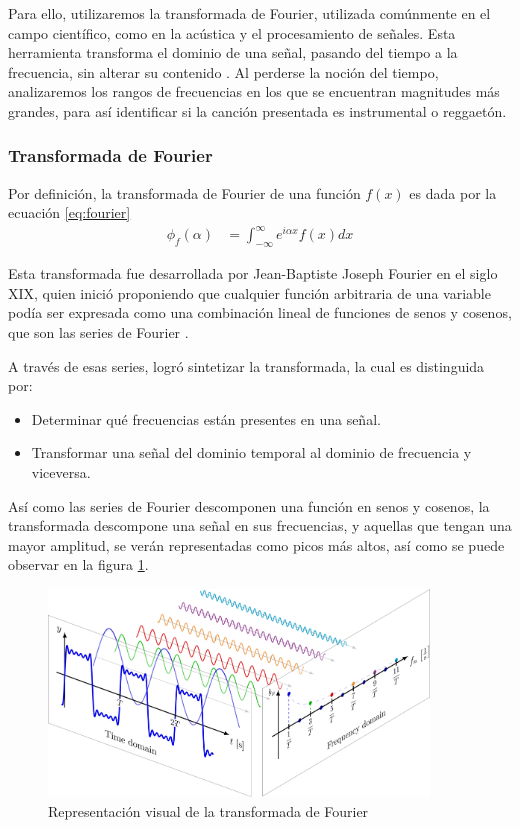 \documentclass[12pt, letterpaper]{article}
\begin{document}
\noindent Para ello, utilizaremos la transformada de Fourier, utilizada
comúnmente en el campo científico, como en la acústica y el procesamiento de señales.
Esta herramienta transforma el dominio de una señal, pasando del tiempo a la frecuencia,
sin alterar su contenido \cite{Bernal-1999}.
Al perderse la noción del tiempo, analizaremos los rangos de frecuencias en los
que se encuentran magnitudes más grandes, para así identificar si la canción presentada
es instrumental o reggaetón.

\subsubsection{Transformada de Fourier}

Por definición, la transformada de Fourier de una función $f(x)$ es dada por la ecuación \ref{eq:fourier}
\begin{align}
	\phi_f(\alpha) &= \int_{-\infty}^{\infty} e^{i\alpha x} f(x) dx
	\label{eq:fourier}
\end{align}

\noindent Esta transformada fue desarrollada por Jean-Baptiste Joseph Fourier en el siglo XIX,
quien inició proponiendo que cualquier función arbitraria de una variable
podía ser expresada como una combinación lineal de funciones de senos y cosenos,
que son las series de Fourier \cite{OGorman-2023}. \medskip

\noindent A través de esas series, logró sintetizar la transformada, la cual
es distinguida por:
\begin{itemize}
  \item Determinar qué frecuencias están presentes en una señal.
  \item Transformar una señal del dominio temporal al dominio de frecuencia y viceversa.
\end{itemize}

\noindent Así como las series de Fourier descomponen una función en senos y cosenos, la
transformada descompone una señal en sus frecuencias, y aquellas que tengan una mayor
amplitud, se verán representadas como picos más altos, así como se puede observar en
la figura \ref{fig:fourier}.

\begin{figure}[H]
  \centering
  \includegraphics[width=0.9\textwidth]{FourierSeries_Freq.png}
  \caption{Representación visual de la transformada de Fourier \cite{OGorman-2023}}
  \label{fig:fourier}
\end{figure}
\end{document}
